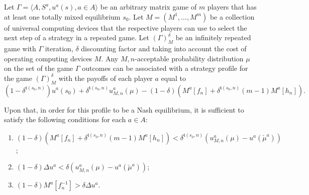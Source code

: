 \begin{theorem}
	Let $\Gamma = \langle A, S^a, u^a(s), a \in A \rangle$ be an arbitrary matrix game of $m$ players that has at least one totally mixed equilibrium $s_0$. Let $M = (M^1, \ldots, M^m)$ be a collection of universal computing devices that the respective players can use to select the next step of a strategy in a repeated game. Let $(\Gamma)_M^{\delta}$ be an infinitely repeated game with $\Gamma$ iteration, $\delta$ discounting factor and taking into account the cost of operating computing devices $M$. Any $M,n$-acceptable probability distribution $\mu$ on the set of the game $\Gamma$ outcomes can be associated with a strategy profile for the game $(\Gamma)_M^{\delta}$ with the payoffs of each player $a$ equal to %
	\begin{equation*}
		(1 - \delta^{\mathfrak{t}(s_0, n)}) u^a(s_0) + \delta^{\mathfrak{t}(s_0, n)} u_{M,n}^a(\mu) - (1 - \delta) (M^a[f_n] + \delta^{\mathfrak{t}(s_0, n)} (m - 1) M^a[h_n]).
	\end{equation*}
	
	Upon that, in order for this profile to be a Nash equilibrium, it is sufficient to satisfy the following conditions for each $a \in A$: %
	\begin{enumerate}
		\item $(1 - \delta) (M^a[f_n] + \delta^{\mathfrak{t}(s_0, n)} (m - 1) M^a[h_n]) < \delta^{\mathfrak{t}(s_0, n)}(u_{M,n}^a(\mu) - u^a(\check{\mu}^a))$;
		\item $(1 - \delta) \Delta u^a < \delta (u_{M,n}^a(\mu) - u^a(\check{\mu}^a))$;
		\item $(1 - \delta) M^a[f_n^{-1}] > \delta \Delta u^a$.
	\end{enumerate}
%
\end{theorem}

